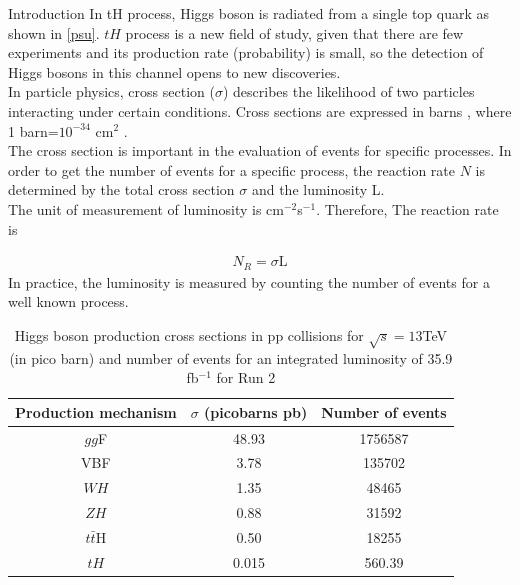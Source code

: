 \begin{chapter}{Introduction}
In tH process, Higgs boson is radiated from a single top quark as shown in \ref{psu}. $tH$ process is a new field of study, given that there are few experiments and its production rate (probability) is small, so the detection of Higgs bosons in this channel opens to new discoveries.
\\

In particle physics, cross section ($\sigma$) describes the likelihood of two particles interacting under certain conditions.
 Cross sections are expressed in barns , where 1 barn=$10^{-34}$ cm$^{2}$ .
\\
The cross section is important in the evaluation of events for specific processes. In order to get the number of events for a specific process,  the reaction rate $N$ is determined by the total cross section $\sigma$ and the luminosity L.\\
The unit of measurement of luminosity is  cm$^{-2}$s$^{-1}$.  Therefore, The reaction rate is 

\begin{align} \label{nr}
N_R=\sigma \text{L}
\end{align}
In practice, the luminosity is measured by counting the number of events for a well known process.

\begin{table}[ht]
\centering
\caption[Higgs boson production cross sections  in pp collisions for $\sqrt{s}=13$TeV  (in pico barn) and number of events for an integrated luminosity of 35.9 fb$^{-1}$ for Run 2]{Higgs boson production cross sections  in pp collisions for $\sqrt{s}=13$TeV  (in pico barn) and number of events for an integrated luminosity of 35.9 fb$^{-1}$ for Run 2 \protect \cite{pd}}
\begin{tabular}{|c|c|c|}
\hline
Production mechanism &
$\sigma$ (picobarns pb) & Number of events \\
\hline
$gg$F & 48.93 & 1756587\\
\hline
VBF & 3.78 & 135702\\
\hline
$WH$ & 1.35 & 48465\\
\hline
$ZH$ &0.88 & 31592\\
\hline
$t\bar{t}$H & 0.50 & 18255\\
\hline
$tH$	& 0.015 & 560.39\\
\hline
\end{tabular}
\label{crt}
\end{table}


\end{chapter}
